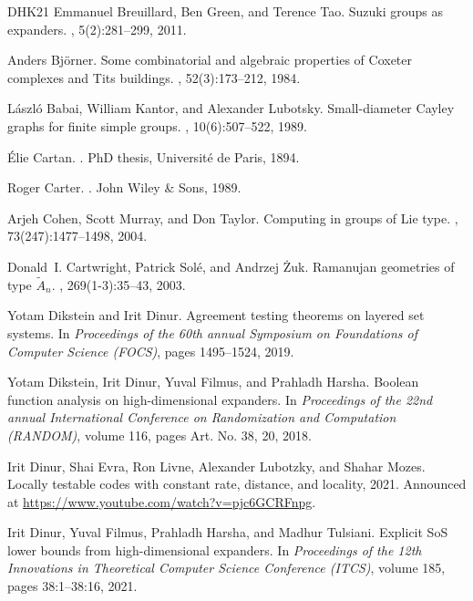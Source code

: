 \documentclass[10pt,a4paper]{article}
\theoremstyle{definition}
\begin{document}
\begin{thebibliography}{DHK{\etalchar{+}}21}
Emmanuel Breuillard, Ben Green, and Terence Tao.
\newblock Suzuki groups as expanders.
, 5(2):281--299, 2011.

Anders Bj{\"o}rner.
\newblock Some combinatorial and algebraic properties of {C}oxeter complexes
  and {T}its buildings.
, 52(3):173--212, 1984.

L{\'a}szl{\'o} Babai, William Kantor, and Alexander Lubotsky.
\newblock Small-diameter {C}ayley graphs for finite simple groups.
, 10(6):507--522, 1989.

{\'E}lie Cartan.
.
\newblock PhD thesis, Universit{\'e} de Paris, 1894.

Roger Carter.
.
\newblock John Wiley \& Sons, 1989.

Arjeh Cohen, Scott Murray, and Don Taylor.
\newblock Computing in groups of {L}ie type.
, 73(247):1477--1498, 2004.

Donald~I. Cartwright, Patrick Sol\'{e}, and Andrzej \.{Z}uk.
\newblock Ramanujan geometries of type {$\tilde{A}_n$}.
, 269(1-3):35--43, 2003.

Yotam Dikstein and Irit Dinur.
\newblock Agreement testing theorems on layered set systems.
\newblock In {\em Proceedings of the 60th annual Symposium on Foundations of
  Computer Science (FOCS)}, pages 1495--1524, 2019.

Yotam Dikstein, Irit Dinur, Yuval Filmus, and Prahladh Harsha.
\newblock Boolean function analysis on high-dimensional expanders.
\newblock In {\em Proceedings of the 22nd annual International Conference on
  Randomization and Computation (RANDOM)}, volume 116, pages Art. No. 38, 20,
  2018.

Irit Dinur, Shai Evra, Ron Livne, Alexander Lubotzky, and Shahar Mozes.
\newblock Locally testable codes with constant rate, distance, and locality,
  2021.
\newblock Announced at \url{https://www.youtube.com/watch?v=pjc6GCRFnpg}.

Irit Dinur, Yuval Filmus, Prahladh Harsha, and Madhur Tulsiani.
\newblock Explicit {SoS} lower bounds from high-dimensional expanders.
\newblock In {\em Proceedings of the 12th Innovations in Theoretical Computer
  Science Conference (ITCS)}, volume 185, pages 38:1--38:16, 2021.


\end{thebibliography}
\end{document}
